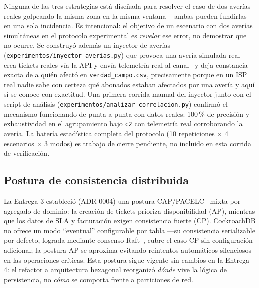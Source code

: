 Ninguna de las tres estrategias está diseñada para resolver el caso de dos averías reales
golpeando la misma zona en la misma ventana -- ambas pueden fundirlas en una sola incidencia. Es
intencional: el objetivo de un escenario con dos averías simultáneas en el protocolo experimental
es \emph{revelar} ese error, no demostrar que no ocurre. Se construyó además un inyector de
averías (\texttt{experimentos/inyector\_averias.py}) que provoca una avería simulada real
--crea tickets reales vía la API y envía telemetría real al canal-- y deja constancia exacta de
a quién afectó en \texttt{verdad\_campo.csv}, precisamente porque en un ISP real nadie sabe con
certeza qué abonados estaban afectados por una avería y aquí sí se conoce con exactitud. Una
primera corrida manual del inyector junto con el script de análisis
(\texttt{experimentos/analizar\_correlacion.py}) confirmó el mecanismo funcionando de punta a
punta con datos reales: 100\,\% de precisión y exhaustividad en el agrupamiento bajo \texttt{c2}
con telemetría real corroborando la avería. La batería estadística completa del protocolo (10
repeticiones $\times$ 4 escenarios $\times$ 3 modos) es trabajo de cierre pendiente, no incluido
en esta corrida de verificación.

\subsection{Postura de consistencia distribuida}

La Entrega 3 estableció (ADR-0004) una postura CAP/PACELC~\cite{brewer2012cap,abadi2012consistency}
mixta por agregado de dominio: la creación de tickets prioriza disponibilidad (AP), mientras que
los datos de SLA y facturación exigen consistencia fuerte (CP). CockroachDB no ofrece un modo
``eventual'' configurable por tabla —su consistencia serializable por defecto, lograda mediante
consenso Raft~\cite{ongaro2014raft}, cubre el caso CP sin configuración adicional; la postura AP
se aproxima evitando reintentos automáticos silenciosos en las operaciones críticas. Esta postura
sigue vigente sin cambios en la Entrega 4: el refactor a arquitectura hexagonal reorganizó
\emph{dónde} vive la lógica de persistencia, no \emph{cómo} se comporta frente a particiones de
red.
